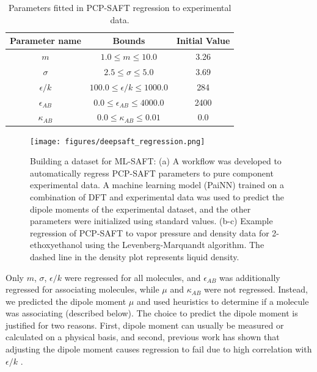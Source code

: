 \begin{table}
    \centering
    \caption{Parameters fitted in PCP-SAFT regression to experimental data.}
    \label{tab:regression_params}
    \begin{tabular}{ccc}
        Parameter name & Bounds & Initial Value \\
        \hline
        $m$ & $1.0 \leq m \leq 10.0$ & 3.26 \\
        $\sigma$ & $2.5 \leq \sigma \leq 5.0$ & 3.69 \\
        $\epsilon/k$ & $100.0 \leq \epsilon/k \leq 1000.0$ & 284 \\
        $\epsilon_{AB}$ & $0.0 \leq \epsilon_{AB} \leq 4000.0$ & 2400 \\
        $\kappa_{AB}$ & $0.0 \leq \kappa_{AB} \leq 0.01$ & 0.0 \\
    \end{tabular}
\end{table}


\begin{figure}
    \centering
    \texttt{[image: figures/deepsaft\_regression.png]}
    \caption{Building a dataset for ML-SAFT: (a) A workflow was developed to automatically regress PCP-SAFT parameters to pure component experimental data. A machine learning model (PaiNN) trained on a combination of DFT and experimental data was used to predict the dipole moments of the experimental dataset, and the other parameters were initialized using standard values. (b-c) Example regression of PCP-SAFT to vapor pressure and density data for 2-ethoxyethanol using the Levenberg-Marquandt algorithm. The dashed line in the density plot represents liquid density.}
    \label{fig:ML-SAFT_regression}
\end{figure}

Only $m$, $\sigma$, $\epsilon/k$ were regressed for all molecules, and $\epsilon_{AB}$ was additionally regressed for associating molecules, while $\mu$ and $\kappa_{AB}$ were not regressed. Instead, we predicted the dipole moment $\mu$ and used heuristics to determine if a molecule was associating (described below). The choice to predict the dipole moment is justified for two reasons. First, dipole moment can usually be measured or calculated on a physical basis, and second, previous work has shown that adjusting the dipole moment causes regression to fail due to high correlation with $\epsilon/k$ \cite{Cripwell2017, deVilliers2011}. 

